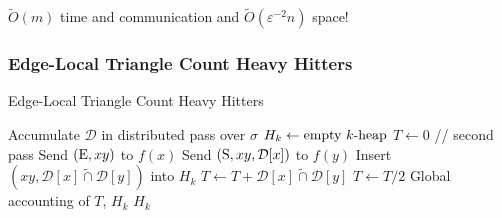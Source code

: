 \documentclass{beamer}
\begin{document}
\begin{frame}
\begin{block}{}
\begin{center}
$\widetilde{O}(m)$ time and communication and $\widetilde{O}(\varepsilon^{-2}n)$ space!
\end{center}
\end{block}

\end{frame}


\begin{frame}
\frametitle{Edge-Local Triangle Count Heavy Hitters}

\begin{algorithm}[H]
\caption{Edge-Local Triangle Count Heavy Hitters}\label{alg:sublinear_kpath}
\begin{algorithmic}[1]
\State Accumulate $\mathcal{D}$ in distributed pass over $\sigma$
\State $H_k \gets \textnormal{empty $k$-heap}$
\State $T \gets 0$
  \qquad // second pass
	\State Send $(\textnormal{E}, xy)$ to $f(x)$
		\State Send $(\textnormal{S}, xy, \mathcal{D}[x])$ to $f(y)$
	\EndFor
		\State Insert $(xy, \mathcal{D}[x] \widetilde{\cap} \mathcal{D}[y])$ into $H_k$
		\State $T \gets T + \mathcal{D}[x] \widetilde{\cap} \mathcal{D}[y]$
	\EndFor
\EndParFor
\State $T \gets T / 2$
\State Global accounting of $T$, $H_k$
\State \Return $H_k$
\end{algorithmic}
\end{algorithm}



\end{frame}


\end{document}
